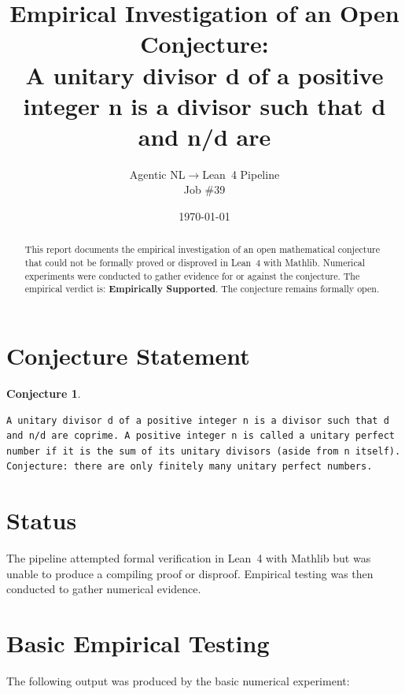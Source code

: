 \documentclass[11pt]{article}
\title{Empirical Investigation of an Open Conjecture:\\
A unitary divisor d of a positive integer n is a divisor such that d and n/d are}
\author{Agentic NL$\to$Lean~4 Pipeline \\ \small Job \#39}
\date{\today}
\newtheorem{conjecture}{Conjecture}
\begin{document}
\maketitle

\begin{abstract}
This report documents the empirical investigation of an open mathematical conjecture
that could not be formally proved or disproved in Lean~4 with Mathlib.
Numerical experiments were conducted to gather evidence for or against the conjecture.
The empirical verdict is: \textbf{\textcolor{green!70!black}{Empirically Supported}}.
The conjecture remains formally open.
\end{abstract}

\section{Conjecture Statement}

\begin{conjecture}
\begin{lstlisting}
A unitary divisor d of a positive integer n is a divisor such that d and n/d are coprime. A positive integer n is called a unitary perfect number if it is the sum of its unitary divisors (aside from n itself). Conjecture: there are only finitely many unitary perfect numbers.
\end{lstlisting}
\end{conjecture}

\section{Status}

\begin{center}
\end{center}

The pipeline attempted formal verification in Lean~4 with Mathlib but was unable to
produce a compiling proof or disproof. Empirical testing was then conducted to gather
numerical evidence.

\section{Basic Empirical Testing}

The following output was produced by the basic numerical experiment:
\end{document}
